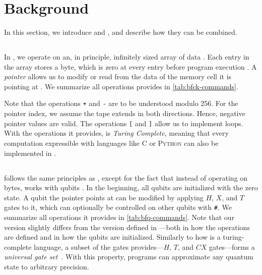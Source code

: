 \section{Background}
\label{sec:background}

In this section, we introduce \bfck{} and \qbfck{}, and describe how they can be combined.

\subsection{\bfck{}}
\label{sec:background-bfck}

In \bfck{}, we operate on an, in principle, infinitely sized array of data \cite{brainfuck-esolangs}. Each entry in the array stores a byte, which is zero at every entry before program execution \cite{brainfuck-esolangs}. A \emph{pointer} allows us to modify or read from the data of the memory cell it is pointing at \cite{brainfuck-esolangs}. We summarize all operations \bfck{} provides in \cref{tab:bfck-commands}.

Note that the operations \texttt{+} and \texttt{-} are to be understood modulo 256. For the pointer index, we assume the tape extends in both directions. Hence, negative pointer values are valid. The operations \texttt{[} and \texttt{]} allow us to implement loops. With the operations it provides, \bfck{} is \emph{Turing Complete}, meaning that every computation expressible with languages like C or \textsc{Python} can also be implemented in \bfck{}. \cite{brainfuck-esolangs}
\subsection{\qbfck{}}
\label{sec:background-bfq}

\qbfck{} follows the same principles as \bfck{}, except for the fact that instead of operating on bytes, \qbfck{} works with qubits \cite{brainfuq-esolangs}. In the beginning, all qubits are initialized with the zero state. A qubit the pointer points at can be modified by applying $H$, $X$, and $T$ gates to it, which can optionally be controlled on other qubits with \texttt{\#}. We summarize all operations it provides in \cref{tab:bfq-commands}. Note that our version slightly differs from the version defined in \cite{brainfuq-esolangs}---both in how the operations are defined and in how the qubits are initialized.
Similarly to how \bfck{} is a turing-complete language, a subset of the gates \qbfck{} provides---$H$, $T$, and $\mathit{CX}$ gates---forms a \emph{universal gate set}~\cite{boykin-2000}. With this property, \qbfck{} programs can approximate any quantum state to arbitrary precision.

